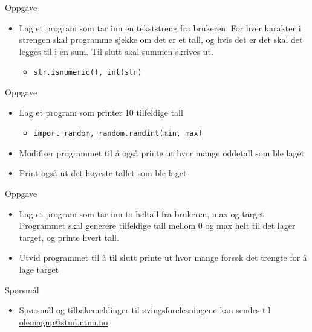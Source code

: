 \documentclass[screen, aspectratio=169]{beamer}
\begin{document}
\begin{frame}{Oppgave}
	\begin{itemize}
		\item Lag et program som tar inn en tekststreng fra brukeren. For hver karakter i strengen skal programme sjekke om det er et tall, og hvis det er det skal det legges til i en sum. Til slutt skal summen skrives ut.
		\begin{itemize}
			\item \lstinline|str.isnumeric(), int(str)|
		\end{itemize}
	\end{itemize}
\end{frame}

\begin{frame}{Oppgave}
	\begin{itemize}
		\item<+-> Lag et program som printer 10 tilfeldige tall
		\begin{itemize}
			\item \lstinline|import random, random.randint(min, max)|
		\end{itemize}
		\item<+-> Modifiser programmet til å også printe ut hvor mange oddetall som ble laget
		\item<+-> Print også ut det høyeste tallet som ble laget
	\end{itemize}
\end{frame}

\begin{frame}{Oppgave}
	\begin{itemize}
		\item<+-> Lag et program som tar inn to heltall fra brukeren, max og target. Programmet skal generere tilfeldige tall mellom 0 og max helt til det lager target, og printe hvert tall.
		\item<+-> Utvid programmet til å til slutt printe ut hvor mange forsøk det trengte for å lage target
	\end{itemize}
\end{frame}

\begin{frame}{Spørsmål}
	\begin{itemize}
		\item Spørsmål og tilbakemeldinger til øvingsforelesningene kan sendes til \href{mailto::olemagnp@stud.ntnu.no}{olemagnp@stud.ntnu.no}
	\end{itemize}
\end{frame}
\end{document}
